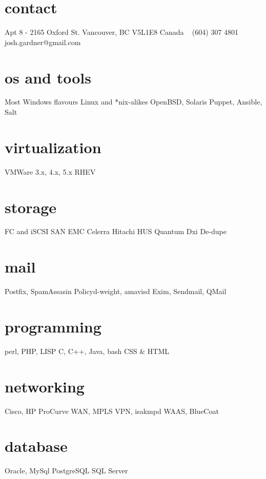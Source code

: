 \documentclass[]{friggeri-cv} %
\begin{document}


\begin{aside} %
\section{contact}
Apt 8 - 2165 Oxford St.
Vancouver, BC V5L1E8
Canada
~
(604) 307 4801
~
josh.gardner@gmail.com
\section{os and tools}
Most Windows flavours
Linux and *nix-alikes
OpenBSD, Solaris
Puppet, Ansible, Salt
\section{virtualization}
VMWare 3.x, 4.x, 5.x
RHEV
\section{storage}
FC and iSCSI SAN
EMC Celerra
Hitachi HUS
Quantum Dxi
De-dupe
\section{mail}
Postfix, SpamAssasin
Policyd-weight, amavisd
Exim, Sendmail, QMail
\section{programming}
perl, PHP, LISP
C, C++, Java, bash
CSS \& HTML
\section{networking}
Cisco, HP ProCurve
WAN, MPLS
VPN, isakmpd
WAAS, BlueCoat
\section{database}
Oracle, MySql
PostgreSQL
SQL Server
\end{aside}



\end{document}
